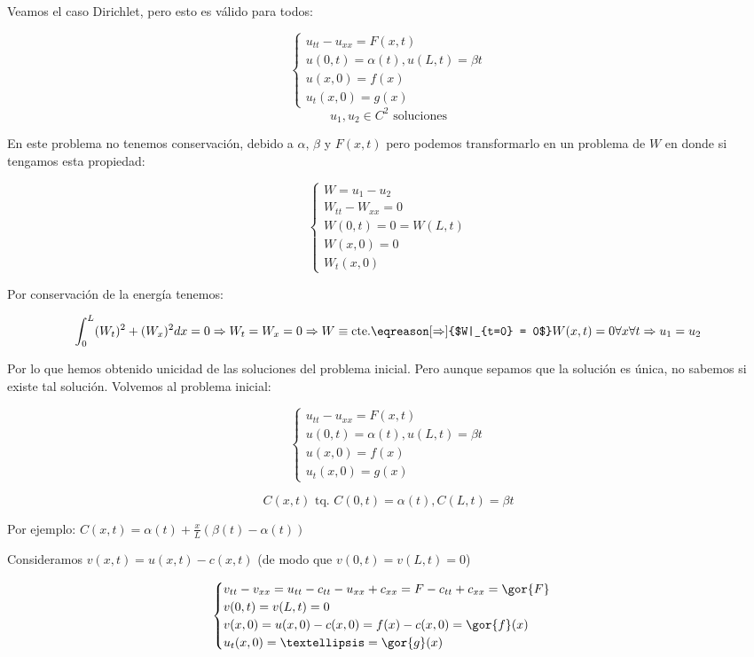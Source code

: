 		 	Veamos el caso Dirichlet, pero esto es válido para todos:

		 	\[ \begin{cases}
		 		u_{tt} - u_{xx} = F(x,t)\\
		 		u(0,t) = \alpha(t), u(L,t) = \beta{t} \\
		 		u(x,0) = f(x) \\
		 		u_t(x,0) = g(x)
		 	\end{cases}\]
		 	\[u_1,u_2 \in C^2 \text{ soluciones}\]

		 	En este problema no tenemos conservación, debido a $\alpha$, $\beta$ y $F(x,t)$ pero podemos transformarlo en un problema de $W$ en donde si tengamos esta propiedad:

		 	\[\begin{cases}
		 		W = u_1 - u_2 \\
		 		W_{tt} - W_{xx} = 0 \\
		 		W(0,t) = 0 = W(L,t) \\
		 		W(x,0) = 0 \\
		 		W_t(x,0)
		 	\end{cases}\]

		 	Por conservación de la energía tenemos:

		 	\[ \int_0^L (W_t)^2 + (W_x)^2 dx = 0 \Rightarrow W_t = W_x = 0 \Rightarrow W \equiv \text{cte.} \eqreason[\Rightarrow]{$W|_{t=0} = 0$} W(x,t) = 0 \forall x \forall t \Rightarrow u_1 = u_2 \]

		 	Por lo que hemos obtenido unicidad de las soluciones del problema inicial. Pero aunque sepamos que la solución es única, no sabemos si existe tal solución. Volvemos al problema inicial:

		 	\[ \begin{cases}
		 		u_{tt} - u_{xx} = F(x,t)\\
		 		u(0,t) = \alpha(t), u(L,t) = \beta{t} \\
		 		u(x,0) = f(x) \\
		 		u_t(x,0) = g(x)
		 	\end{cases}\]


		 	\[ C(x,t) \text{ tq. } C(0,t) = \alpha(t), C(L,t) = \beta{t}\]

		 	Por ejemplo: $C(x,t) = \alpha(t) + \frac{x}{L} (\beta(t)-\alpha(t))$

		 	Consideramos $v(x,t) = u(x,t) - c(x,t)$ (de modo que $v(0,t) = v(L,t) = 0$)

		 	\[\begin{cases}
		 		v_{tt} - v_{xx} = u_{tt} - c_{tt} - u_{xx} + c_{xx} = F - c_{tt} + c_{xx} = \gor{F} \\
		 		v(0,t) = v(L,t) = 0 \\
		 		v(x,0) = u(x,0) - c(x,0) = f(x) - c(x,0) = \gor{f}(x) \\
		 		u_t (x,0) = … = \gor{g}(x)
		 	\end{cases}
		 	\]

